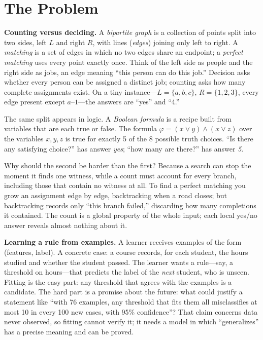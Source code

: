 \section{The Problem}
\noindent\textbf{Counting versus deciding.} A \emph{bipartite graph} is a collection of points split into two sides, left \(L\) and right \(R\), with lines (\emph{edges}) joining only left to right. A \emph{matching} is a set of edges in which no two edges share an endpoint; a \emph{perfect matching} uses every point exactly once. Think of the left side as people and the right side as jobs, an edge meaning ``this person can do this job.'' Decision asks whether every person can be assigned a distinct job; counting asks how many complete assignments exist. On a tiny instance---\(L=\{a,b,c\}\), \(R=\{1,2,3\}\), every edge present except \(a\)--\(1\)---the answers are ``yes'' and ``4.''

The same split appears in logic. A \emph{Boolean formula} is a recipe built from variables that are each true or false. The formula \(\varphi=(x\vee y)\wedge(x\vee z)\) over the variables \(x,y,z\) is true for exactly 5 of the 8 possible truth choices. ``Is there any satisfying choice?'' has answer \emph{yes}; ``how many are there?'' has answer \emph{5}.

Why should the second be harder than the first? Because a search can stop the moment it finds one witness, while a count must account for every branch, including those that contain no witness at all. To find a perfect matching you grow an assignment edge by edge, backtracking when a road closes; but backtracking records only ``this branch failed,'' discarding how many completions it contained. The count is a global property of the whole input; each local yes/no answer reveals almost nothing about it.

\noindent\textbf{Learning a rule from examples.} A learner receives examples of the form (features, label). A concrete case: a course records, for each student, the hours studied and whether the student passed. The learner wants a rule---say, a threshold on hours---that predicts the label of the \emph{next} student, who is unseen. Fitting is the easy part: any threshold that agrees with the examples is a candidate. The hard part is a promise about the future: what could justify a statement like ``with 76 examples, any threshold that fits them all misclassifies at most 10 in every 100 new cases, with 95\% confidence''? That claim concerns data never observed, so fitting cannot verify it; it needs a model in which ``generalizes'' has a precise meaning and can be proved.

